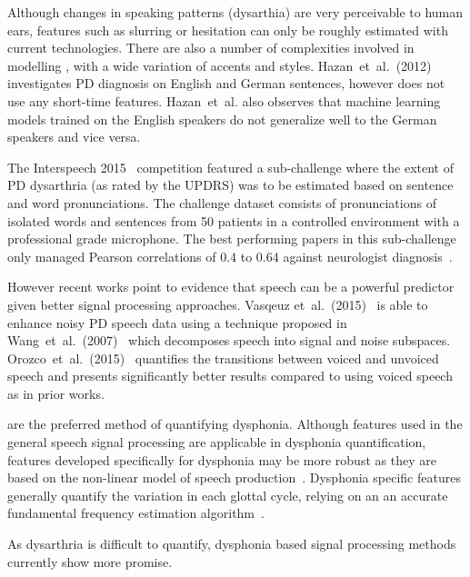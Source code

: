 \documentclass[12pt, twoside]{book}
\renewcommand\emph[1]{\textit{\color{USred}{#1}}}
\begin{document}
Although changes in speaking patterns (dysarthia) are very perceivable to human ears, features such as slurring or hesitation can only be roughly estimated with current technologies. There are also a number of complexities involved in modelling \emph{spoken language}, with a wide variation of accents and styles. Hazan~et~al.~(2012)~\cite{hazan2012} investigates PD diagnosis on English and German sentences, however does not use any short-time features.  Hazan~et~al. also observes that machine learning models trained on the English speakers do not generalize well to the German speakers and vice versa. 

The Interspeech 2015~\cite{compareis15pd} competition featured a sub-challenge where the extent of PD dysarthria (as rated by the UPDRS) was to be estimated based on sentence and word pronunciations. The challenge dataset consists of pronunciations of isolated words and sentences from 50 patients in a controlled environment with a professional grade microphone. The best performing papers in this sub-challenge only managed Pearson correlations of 0.4 to 0.64 against neurologist diagnosis~\cite{hahm2015parkinson,grosz2015assessingis15,williamson2015segment}.

However recent works point to evidence that speech can be a powerful predictor given better signal processing approaches. Vasqeuz et~al.~(2015)~\cite{vasquez2015automatic} is able to enhance noisy PD speech data using a technique proposed in Wang~et~al.~(2007)~\cite{wang2007speechenhancement} which decomposes speech into signal and noise subspaces. Orozco~et~al.~(2015)~\cite{orozco2015voiced} quantifies the transitions between voiced and unvoiced speech and presents significantly better results compared to using voiced speech as in prior works.

\emph{Sustained vowel phonations} are the preferred method of quantifying dysphonia. Although features used in the general speech signal processing are applicable in dysphonia quantification, features developed specifically for dysphonia may be more robust as they are based on the non-linear model of speech production~\cite{splittledysphonia2009, splittlenonlinear2007}. Dysphonia specific features generally quantify the variation in each glottal cycle, relying on an an accurate fundamental frequency estimation algorithm~\cite{f0estimation}. 

\begin{highlight}
As dysarthria is difficult to quantify, dysphonia based signal processing methods currently show more promise.
\end{highlight}
\end{document}
